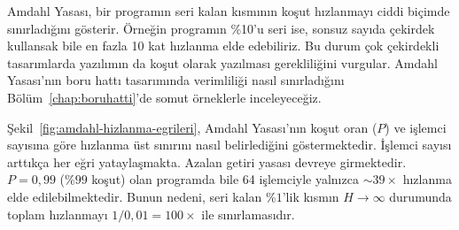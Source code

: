 \begin{bilginot}
Amdahl Yasası, bir programın seri kalan kısmının koşut hızlanmayı ciddi biçimde sınırladığını gösterir. Örneğin programın \%10'u seri ise, sonsuz sayıda çekirdek kullansak bile en fazla 10 kat hızlanma elde edebiliriz. Bu durum çok çekirdekli tasarımlarda yazılımın da koşut olarak yazılması gerekliliğini vurgular. Amdahl Yasası'nın boru hattı tasarımında verimliliği nasıl sınırladığını Bölüm~\ref{chap:boruhatti}'de somut örneklerle inceleyeceğiz.
\end{bilginot}

Şekil~\ref{fig:amdahl-hizlanma-egrileri}, Amdahl Yasası'nın koşut oran ($P$) ve işlemci sayısına göre hızlanma üst sınırını nasıl belirlediğini göstermektedir. İşlemci sayısı arttıkça her eğri yataylaşmakta. Azalan getiri yasası devreye girmektedir. $P=0{,}99$ ($\%99$ koşut) olan programda bile 64 işlemciyle yalnızca $\sim$$39\times$ hızlanma elde edilebilmektedir. Bunun nedeni, seri kalan $\%1$'lik kısmın $H\to\infty$ durumunda toplam hızlanmayı $1/0{,}01 = 100\times$ ile sınırlamasıdır.

